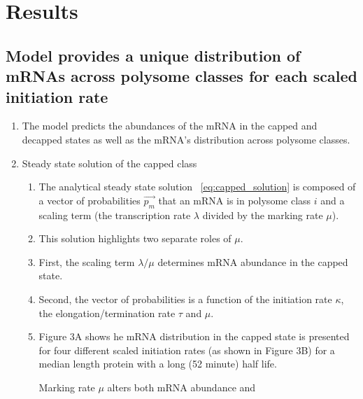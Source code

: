 \documentclass[review]{elsarticle}
\begin{document}


\section{Results}

\subsection{Model provides a unique distribution of mRNAs across polysome classes for each scaled initiation rate}
\begin{enumerate}
\item The model predicts the abundances of the mRNA in the capped and decapped states as well as the mRNA's distribution across polysome classes.
\item Steady state solution of the capped class
\begin{enumerate}
  \item The analytical steady state solution ~\ref{eq:capped_solution} is composed of a vector of probabilities $\vec{p_m}$ that an mRNA is in polysome class $i$ and a scaling term (the transcription rate $\lambda$ divided by the marking rate $\mu$). 
  \item This solution highlights two separate roles of $\mu$.
  \item First, the scaling term $\lambda / \mu$ determines mRNA abundance in the capped state.
  \item Second, the vector of probabilities is a function of the initiation rate $\kappa$, the elongation/termination rate $\tau$ and $\mu$.
  \item Figure 3A shows he mRNA distribution in the capped state is presented for four different scaled initiation rates (as shown in Figure 3B) for a median length protein with a long (52 minute) half life.

 Marking rate $\mu$ alters both mRNA abundance and

\end{enumerate}


\end{enumerate}
\end{document}
